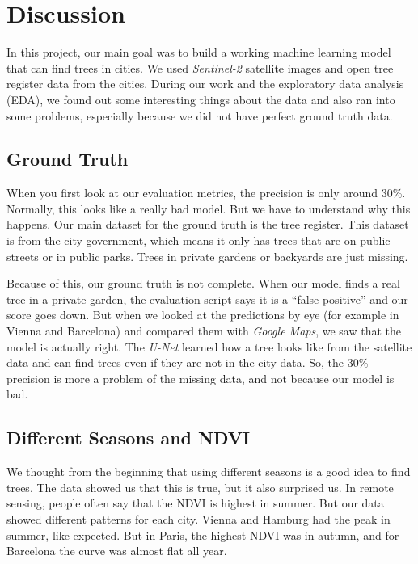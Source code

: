 \section{Discussion}

In this project, our main goal was to build a working machine learning model that can find trees in cities. We used \textit{Sentinel-2} satellite images and open tree register data from the cities. During our work and the exploratory data analysis (EDA), we found out some interesting things about the data and also ran into some problems, especially because we did not have perfect ground truth data. 

\subsection{Ground Truth}

When you first look at our evaluation metrics, the precision is only around 30\%. Normally, this looks like a really bad model. But we have to understand why this happens. Our main dataset for the ground truth is the tree register. This dataset is from the city government, which means it only has trees that are on public streets or in public parks. Trees in private gardens or backyards are just missing. 

Because of this, our ground truth is not complete. When our model finds a real tree in a private garden, the evaluation script says it is a ``false positive'' and our score goes down. But when we looked at the predictions by eye (for example in Vienna and Barcelona) and compared them with \textit{Google Maps}, we saw that the model is actually right. The \textit{U-Net} learned how a tree looks like from the satellite data and can find trees even if they are not in the city data. So, the 30\% precision is more a problem of the missing data, and not because our model is bad.

\subsection{Different Seasons and NDVI}

We thought from the beginning that using different seasons is a good idea to find trees. The data showed us that this is true, but it also surprised us. In remote sensing, people often say that the NDVI is highest in summer. But our data showed different patterns for each city. Vienna and Hamburg had the peak in summer, like expected. But in Paris, the highest NDVI was in autumn, and for Barcelona the curve was almost flat all year. 

